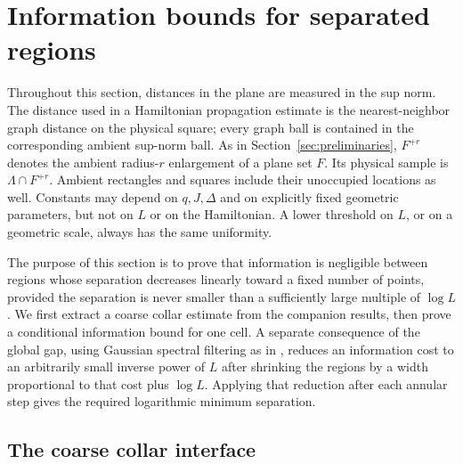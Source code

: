 \section{Information bounds for separated regions}
\label{sec:information}

Throughout this section, distances in the plane are measured in the sup
norm.  The distance used in a Hamiltonian propagation estimate is the
nearest-neighbor graph distance on the physical square; every graph ball
is contained in the corresponding ambient sup-norm ball.  As in Section~\ref{sec:preliminaries}, $F^{+r}$ denotes the ambient
radius-$r$ enlargement of a plane set $F$.  Its physical sample is
$\Lambda\cap F^{+r}$.  Ambient rectangles and squares include their
unoccupied locations as well.  Constants
may depend on $q,J,\Delta$ and on explicitly fixed geometric parameters,
but not on $L$ or on the Hamiltonian.  A lower threshold on $L$, or on a
geometric scale, always has the same uniformity.

The purpose of this section is to prove that information is negligible
between regions whose separation decreases linearly toward a fixed
number of points, provided the separation is never smaller than a
sufficiently large multiple of $\log L$.  We first extract a coarse
collar estimate from the companion results, then prove a conditional
information bound for one cell.  A separate consequence of the global
gap, using Gaussian spectral filtering as in \cite{Hastings2006Local}, reduces an information cost to an arbitrarily small inverse
power of $L$ after shrinking the regions by a width proportional to that
cost plus $\log L$.  Applying that reduction after each annular step gives the
required logarithmic minimum separation.

\subsection{The coarse collar interface}


